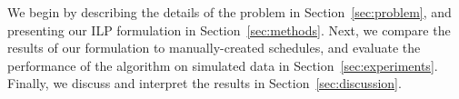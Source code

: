 We begin by describing the details of the problem in Section~\ref{sec:problem}, and presenting
our ILP formulation in Section~\ref{sec:methods}. Next, we compare the results
of our formulation to manually-created schedules, and evaluate the performance
of the algorithm on simulated data in Section~\ref{sec:experiments}. Finally, we
discuss and interpret the results in Section~\ref{sec:discussion}. %
